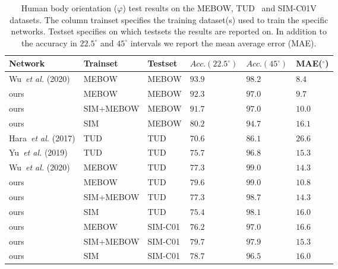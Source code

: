 \documentclass[a4paper, 10pt, conference]{ieeeconf}
\begin{document}
\begin{table*}[!htbp]
  \centering

  \begin{tabular}{l l l l l l} \toprule
      Network & Trainset & Testset & $Acc. (22.5^\circ)$ & $Acc. (45^\circ)$ & MAE($^\circ$) \\ 
      \midrule
      Wu~\textit{et al.}\cite{wuMEBOWMonocularEstimation2020} (2020) & MEBOW & MEBOW & $\mathbf{93.9}$ & $\mathbf{98.2}$ & $8.4$ \\
      ours & MEBOW & MEBOW & $\mathbf{92.3}$ & $\mathbf{97.0}$ & $9.7$ \\
      ours & SIM+MEBOW & MEBOW & $91.7$ & $\mathbf{97.0}$ & $10.0$ \\
      ours & SIM & MEBOW & $80.2$ & $94.7$ & $16.1$ \\\midrule
      Hara~\textit{et al.}\cite{haraDesigningDeepConvolutional2017} (2017) & TUD & TUD & $70.6$ & $86.1$ & $26.6$ \\
      Yu~\textit{et al.}\cite{yuContinuousPedestrianOrientation2019} (2019) & TUD & TUD & $75.7$ & $96.8$ & $15.3$ \\
      Wu~\textit{et al.}\cite{wuMEBOWMonocularEstimation2020} (2020) & MEBOW & TUD & $77.3$ & $99.0$ & $14.3$ \\
      ours & MEBOW & TUD & $\mathbf{79.6}$ & $\mathbf{99.0}$ & $10.8$ \\
      ours & SIM+MEBOW & TUD & $\mathbf{77.3}$ & $\mathbf{98.7}$ & $14.3$ \\
      ours & SIM & TUD & $\mathbf{75.4}$ & $\mathbf{98.1}$ & $16.0$ \\
      \midrule
      ours & MEBOW & SIM-C01 & $76.2$ & $97.0$ & $16.6$ \\
      ours & SIM+MEBOW & SIM-C01 & $\mathbf{79.7}$ & $\mathbf{97.9}$ & $15.3$ \\
      ours & SIM & SIM-C01 & $78.7$ & $96.5$ & $16.0$ \\
  \end{tabular}
  \caption[Human body orientation ($\varphi$) results]{Human body orientation ($\varphi$) test results on the MEBOW, TUD~\cite{andrilukaMonocular3DPose2010} and SIM-C01V datasets. The column trainset specifies the training dataset(s) used to train the specific networks. Testset specifies on which testsets the results are reported on. In addition to the accuracy in $22.5^{\circ}$ and $45^{\circ}$ intervals we report the mean average error (MAE).}
  \label{tab:pedrec_body_orientation_estimation_results}
\end{table*}
\end{document}
